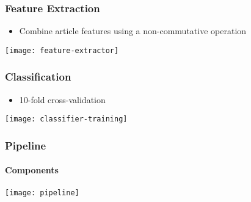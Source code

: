 \begin{frame}
    \frametitle{Feature Extraction}
    \centering

    \begin{itemize}
      \item Combine article features using a non-commutative operation
    \end{itemize}

    \texttt{[image: feature-extractor]}

\end{frame}


\begin{frame}
    \frametitle{Classification}
    \centering

    \begin{itemize}
      \item 10-fold cross-validation
    \end{itemize}

    \texttt{[image: classifier-training]}

\end{frame}


\begin{frame}
    \frametitle{Pipeline}
    \framesubtitle{Components}
    \centering

    \texttt{[image: pipeline]}

\end{frame}


